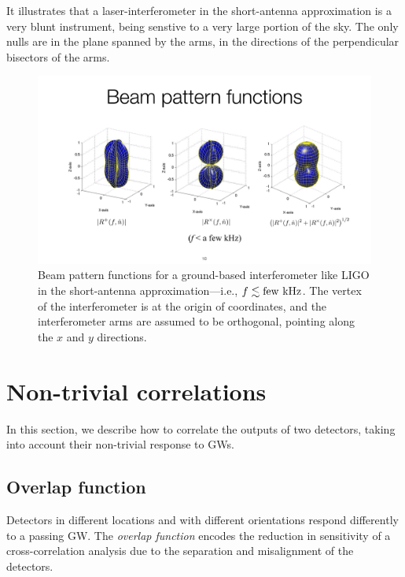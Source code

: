 It illustrates that a laser-interferometer in the 
short-antenna approximation is a very blunt instrument,
being senstive to a very large portion of the sky. 
The only nulls are in the plane spanned by the arms, 
in the directions of the perpendicular bisectors of 
the arms.
%
\begin{figure}[htbp!]
\begin{center}
\includegraphics[width=\textwidth]{Figures/LIGO_beam_patterns}
\caption{Beam pattern functions for a ground-based interferometer
like LIGO in the short-antenna approximation---i.e., $f\lesssim {\rm few\ kHz}$.
The vertex of the interferometer is at the origin of coordinates,
and the interferometer arms are assumed to be orthogonal, pointing along
the $x$ and $y$ directions.}
\label{f:LIGO_beam_patterns}
\end{center}
\end{figure}
%

\section{Non-trivial correlations}
\label{s:nontrivial_correlations}

In this section, we describe how to correlate the outputs
of two detectors, taking into account their non-trivial
response to GWs.

\subsection{Overlap function}

Detectors in different locations and with different 
orientations respond differently to a passing GW.
The {\em overlap function} encodes the reduction in 
sensitivity of a cross-correlation analysis due to 
the separation and misalignment of the detectors.

